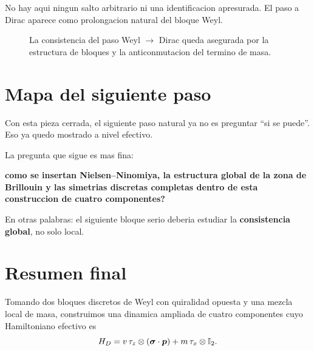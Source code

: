 No hay aqui ningun salto arbitrario ni una identificacion apresurada. El paso a Dirac aparece como prolongacion natural del bloque Weyl.

\begin{figure}[h!]
\centering
{}
\caption{La consistencia del paso Weyl \(\to\) Dirac queda asegurada por la estructura de bloques y la anticonmutacion del termino de masa.}
\end{figure}

\section{Mapa del siguiente paso}
Con esta pieza cerrada, el siguiente paso natural ya no es preguntar \enquote{si se puede}. Eso ya quedo mostrado a nivel efectivo.

La pregunta que sigue es mas fina:
\begin{displayquote}
\textbf{como se insertan Nielsen--Ninomiya, la estructura global de la zona de Brillouin y las simetrias discretas completas dentro de esta construccion de cuatro componentes?}
\end{displayquote}

En otras palabras: el siguiente bloque serio deberia estudiar la \textbf{consistencia global}, no solo local.

\section{Resumen final}
Tomando dos bloques discretos de Weyl con quiralidad opuesta y una mezcla local de masa, construimos una dinamica ampliada de cuatro componentes cuyo Hamiltoniano efectivo es
\begin{equation}
H_D = v\,\tau_z\otimes(\bm{\sigma}\cdot\bm{p}) + m\,\tau_x\otimes\mathbb{I}_2.
\end{equation}

